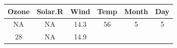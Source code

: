 \documentclass[]{article}
\theoremstyle{definition}
\theoremstyle{definition}
\theoremstyle{definition}
\theoremstyle{remark}
\begin{document}
\begin{longtable}[]{@{}cccccc@{}}
\toprule
\begin{minipage}[b]{0.09\columnwidth}\centering\strut
Ozone\strut
\end{minipage} & \begin{minipage}[b]{0.12\columnwidth}\centering\strut
Solar.R\strut
\end{minipage} & \begin{minipage}[b]{0.08\columnwidth}\centering\strut
Wind\strut
\end{minipage} & \begin{minipage}[b]{0.08\columnwidth}\centering\strut
Temp\strut
\end{minipage} & \begin{minipage}[b]{0.09\columnwidth}\centering\strut
Month\strut
\end{minipage} & \begin{minipage}[b]{0.06\columnwidth}\centering\strut
Day\strut
\end{minipage}\tabularnewline
\midrule
\endhead
\begin{minipage}[t]{0.09\columnwidth}\centering\strut
NA\strut
\end{minipage} & \begin{minipage}[t]{0.12\columnwidth}\centering\strut
NA\strut
\end{minipage} & \begin{minipage}[t]{0.08\columnwidth}\centering\strut
14.3\strut
\end{minipage} & \begin{minipage}[t]{0.08\columnwidth}\centering\strut
56\strut
\end{minipage} & \begin{minipage}[t]{0.09\columnwidth}\centering\strut
5\strut
\end{minipage} & \begin{minipage}[t]{0.06\columnwidth}\centering\strut
5\strut
\end{minipage}\tabularnewline
\begin{minipage}[t]{0.09\columnwidth}\centering\strut
28\strut
\end{minipage} & \begin{minipage}[t]{0.12\columnwidth}\centering\strut
NA\strut
\end{minipage} & \begin{minipage}[t]{0.08\columnwidth}\centering\strut
14.9\strut
\end{minipage} & \begin{minipage}[t]{0.08\columnwidth}\centering\strut

\end{minipage}
\end{longtable}
\end{document}
